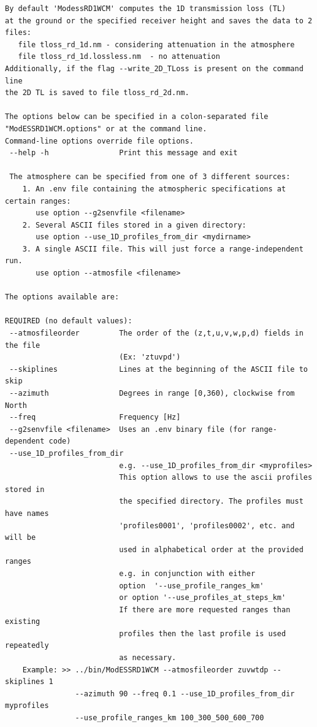 \begin{verbatim}
By default 'ModessRD1WCM' computes the 1D transmission loss (TL)
at the ground or the specified receiver height and saves the data to 2 files:
   file tloss_rd_1d.nm - considering attenuation in the atmosphere
   file tloss_rd_1d.lossless.nm  - no attenuation
Additionally, if the flag --write_2D_TLoss is present on the command line 
the 2D TL is saved to file tloss_rd_2d.nm.

The options below can be specified in a colon-separated file 
"ModESSRD1WCM.options" or at the command line. 
Command-line options override file options.
 --help -h                Print this message and exit

 The atmosphere can be specified from one of 3 different sources:
    1. An .env file containing the atmospheric specifications at certain ranges:
       use option --g2senvfile <filename>
    2. Several ASCII files stored in a given directory:
       use option --use_1D_profiles_from_dir <mydirname>
    3. A single ASCII file. This will just force a range-independent run.
       use option --atmosfile <filename>

The options available are:

REQUIRED (no default values):
 --atmosfileorder         The order of the (z,t,u,v,w,p,d) fields in the file
                          (Ex: 'ztuvpd')
 --skiplines              Lines at the beginning of the ASCII file to skip
 --azimuth                Degrees in range [0,360), clockwise from North
 --freq                   Frequency [Hz]
 --g2senvfile <filename>  Uses an .env binary file (for range-dependent code)
 --use_1D_profiles_from_dir
                          e.g. --use_1D_profiles_from_dir <myprofiles>
                          This option allows to use the ascii profiles stored in
                          the specified directory. The profiles must have names
                          'profiles0001', 'profiles0002', etc. and will be
                          used in alphabetical order at the provided ranges
                          e.g. in conjunction with either
                          option  '--use_profile_ranges_km' 
                          or option '--use_profiles_at_steps_km'
                          If there are more requested ranges than existing
                          profiles then the last profile is used repeatedly
                          as necessary.
    Example: >> ../bin/ModESSRD1WCM --atmosfileorder zuvwtdp --skiplines 1
                --azimuth 90 --freq 0.1 --use_1D_profiles_from_dir myprofiles
                --use_profile_ranges_km 100_300_500_600_700


\end{verbatim}
